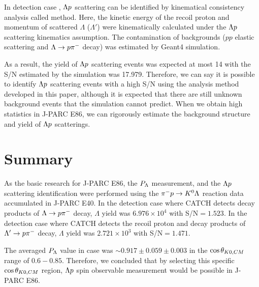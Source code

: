 \documentclass[a4paper,11pt,twoside,twocolumn]{article}
\begin{document}
In detection case , $\Lambda p$ scattering can be identified by kinematical consistency analysis called  method. Here, the kinetic energy of the recoil proton and momentum of scattered $\Lambda$ ($\Lambda'$) were kinematically calculated under the $\Lambda p$ scattering kinematics assumption. The contamination of backgrounds ($pp$ elastic scattering and $\Lambda\to p\pi^{-}$ decay) was estimated by Geant4 simulation. 

As a result, the yield of $\Lambda p$ scattering events was expected at most 14 with the S/N estimated by the simulation was 17.979. Therefore, we can say it is possible to identify $\Lambda p$ scattering events with a high S/N using the analysis method developed in this paper, although it is expected that there are still unknown background events that the simulation cannot predict. When we obtain high statistics in J-PARC E86, we can rigorously estimate the background structure and yield of $\Lambda p$ scatterings. 

\section{Summary}
\label{sec-summary}

As the basic research for J-PARC E86, the $P_{\Lambda}$ measurement, and the $\Lambda p$ scattering identification were performed using the $\pi^- p \to K^0 \Lambda$ reaction data accumulated in J-PARC E40. %
In the detection case  where CATCH detects decay products of $\Lambda\to p\pi^{-}$ decay, $\Lambda$ yield was $6.976\times10^{4}$ with S/N$=1.523$. In the detection case  where CATCH detects the recoil proton and decay products of $\Lambda'\to p\pi^{-}$ decay, $\Lambda$ yield was $2.721\times10^{3}$ with S/N$=1.471$. 

The averaged $P_{\Lambda}$ value in case  was $\sim0.917\pm0.059\pm0.003$ in the $\cos{\theta_{K0,CM}}$ range of $0.6 - 0.85$. Therefore, we concluded that by selecting this specific $\cos{\theta_{K0,CM}}$ region, $\Lambda p$ spin observable measurement would be possible in J-PARC E86.
\end{document}
